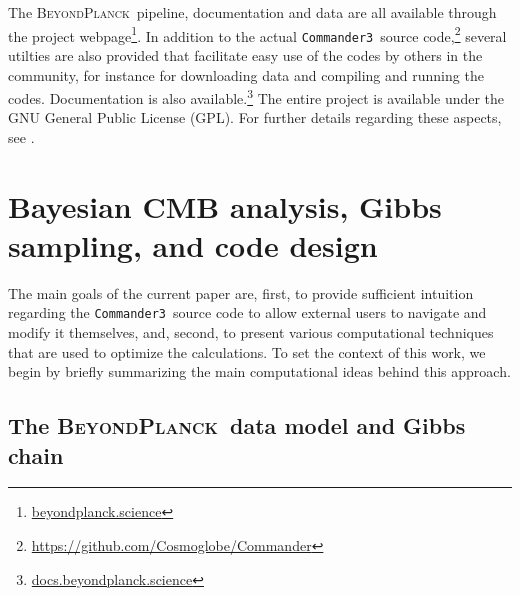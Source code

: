 \documentclass[twocolumn]{aa}
\def\commanderthree{\texttt{Commander3}}
\newcommand{\BP}{\textsc{BeyondPlanck}}
\begin{document}
The \BP\ pipeline, documentation and data are all available through
the project webpage\footnote{\url{beyondplanck.science}}. In addition
to the actual \commanderthree\ source
code,\footnote{\url{https://github.com/Cosmoglobe/Commander}} several
utilties are also provided that facilitate easy use of the codes by
others in the community, for instance for downloading data and
compiling and running the codes. Documentation is also
available.\footnote{\url{docs.beyondplanck.science}} The entire
project is available under the GNU General Public License (GPL).  For
further details regarding these aspects, see \citet{BP05}.

\section{Bayesian CMB analysis, Gibbs sampling, and code design}
\label{sec:gibbs}

The main goals of the current paper are, first, to provide sufficient
intuition regarding the \commanderthree\ source code to allow external
users to navigate and modify it themselves, and, second, to present
various computational techniques that are used to optimize the
calculations. To set the context of this work, we begin by briefly
summarizing the main computational ideas behind this approach.

\subsection{The \BP\ data model and Gibbs chain}
\label{sec:bp}
\end{document}
